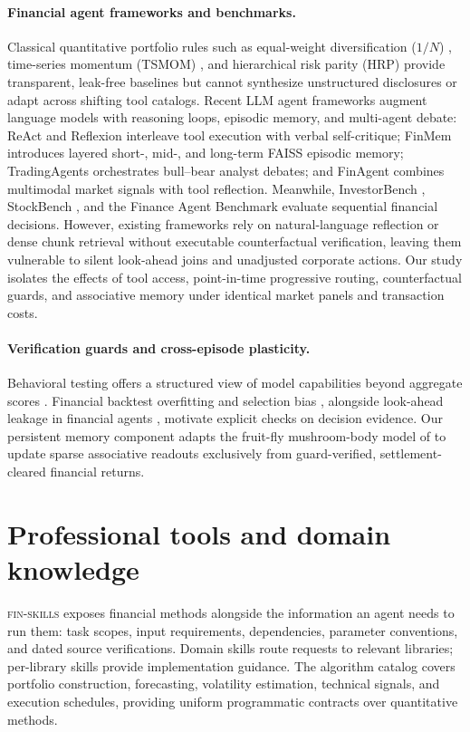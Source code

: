 \documentclass[11pt]{article}
\begin{document}
\paragraph{Financial agent frameworks and benchmarks.}
Classical quantitative portfolio rules such as equal-weight diversification ($1/N$)
\cite{demiguel2009optimal}, time-series momentum (TSMOM) \cite{moskowitz2012time}, and
hierarchical risk parity (HRP) \cite{lopez2016building} provide transparent, leak-free
baselines but cannot synthesize unstructured disclosures or adapt across shifting tool
catalogs. Recent LLM agent frameworks augment language models with reasoning loops,
episodic memory, and multi-agent debate: ReAct \cite{yao2023react} and Reflexion
\cite{shinn2023reflexion} interleave tool execution with verbal self-critique; FinMem
\cite{yu2024finmem} introduces layered short-, mid-, and long-term FAISS episodic memory;
TradingAgents \cite{xiao2024tradingagents} orchestrates bull--bear analyst debates; and
FinAgent \cite{zhang2024finagent} combines multimodal market signals with tool reflection.
Meanwhile, InvestorBench \cite{kou2024investorbench}, StockBench \cite{chen2025stockbench},
and the Finance Agent Benchmark \cite{bigeard2025finance} evaluate sequential financial
decisions. However, existing frameworks rely on natural-language reflection or dense chunk
retrieval without executable counterfactual verification, leaving them vulnerable to silent
look-ahead joins and unadjusted corporate actions. Our study isolates the effects of tool
access, point-in-time progressive routing, counterfactual guards, and associative memory
under identical market panels and transaction costs.

\paragraph{Verification guards and cross-episode plasticity.}
Behavioral testing offers a structured view of model capabilities beyond aggregate
scores \cite{ribeiro2020checklist}. Financial backtest overfitting and selection bias
\cite{bailey2014deflated,bailey2017pbo}, alongside look-ahead leakage in financial agents
\cite{li2025profit}, motivate explicit checks on decision evidence. Our persistent memory
component adapts the fruit-fly mushroom-body model of \citet{huang2024memory} to update
sparse associative readouts exclusively from guard-verified, settlement-cleared financial
returns.



\section{Professional tools and domain knowledge}
\label{sec:library}
\textsc{fin-skills} exposes financial methods alongside the information an agent needs
to run them: task scopes, input requirements, dependencies, parameter conventions, and
dated source verifications. Domain skills route requests to relevant libraries; per-library
skills provide implementation guidance. The algorithm catalog covers portfolio
construction, forecasting, volatility estimation, technical signals, and execution
schedules, providing uniform programmatic contracts over quantitative methods.
\end{document}
